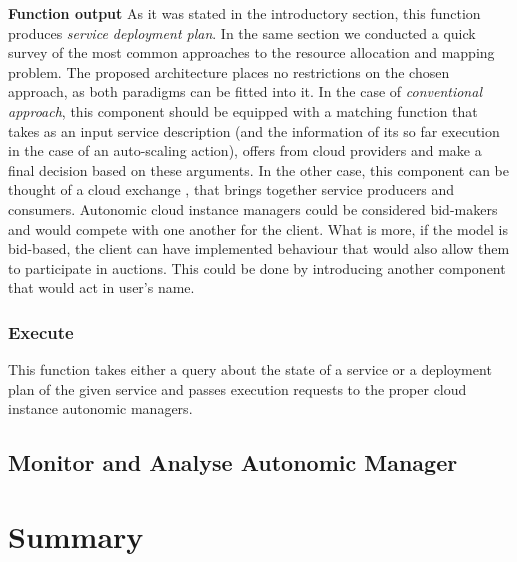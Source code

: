 \begin{asparaenum}
\item[\textbf{Function output}] As it was stated in the introductory section, this function produces \emph{service deployment plan}. In the same section we conducted a quick survey of the most common approaches to the resource allocation and mapping problem. The proposed architecture places no restrictions on the chosen approach, as both paradigms can be fitted into it. In the case of \emph{conventional approach}, this component should be equipped with a matching function that takes as an input service description (and the information of its so far execution in the case of an auto-scaling action), offers from cloud providers and make a final decision based on these arguments.
  In the other case, this component can be thought of a cloud exchange \cite{InterCloud10}, that brings together service producers and consumers. Autonomic cloud instance managers could be considered bid-makers and would compete with one another for the client. What is more, if the model is bid-based, the client can have implemented behaviour that would also allow them to participate in auctions. This could be done by introducing another component that would act in user's name.
\end{asparaenum}

\subsubsection{Execute}
This function takes either a query about the state of a service or a deployment plan of the given service and passes execution requests to the proper cloud instance autonomic managers.
\subsection{Monitor and Analyse Autonomic Manager}

\section{Summary}
